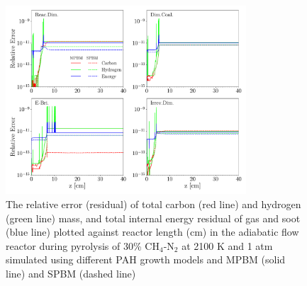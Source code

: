 \begin{figure}[H]
	\centering
	\includegraphics[width=0.8\textwidth]{Figures/Results/Validation/PFR/relerr_pfr.pdf}
	\caption{The relative error (residual) of total carbon (red line) and hydrogen (green line) mass, and total internal energy residual of gas and soot (blue line) plotted against reactor length (cm) in the adiabatic flow reactor during pyrolysis of 30\% $\mathrm{CH_4}$-$\mathrm{N_2}$ at 2100 K and 1 atm simulated using different PAH growth models and MPBM (solid line) and SPBM (dashed line)}
	\label{fig:pfrvalid}
\end{figure}
